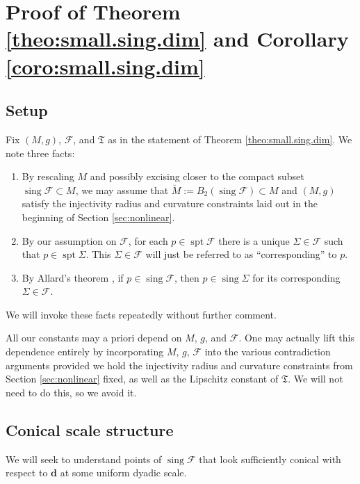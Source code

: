 \documentclass[11pt, letterpaper, reqno]{amsart}
\numberwithin{equation}{section}
\theoremstyle{remark}
\newcommand{\mbfd}{\mathbf{d}}
\newcommand{\frT}{\mathfrak{T}}
\newcommand{\supp}{\operatorname{spt}}
\newcommand{\sing}{\operatorname{sing}}
\begin{document}

\section{Proof of Theorem \ref{theo:small.sing.dim} and Corollary \ref{coro:small.sing.dim}} \label{sec:proof}

\subsection{Setup} \label{sec:proof.setup}

Fix $(M, g)$, $\mathscr{F}$, and $\frT$ as in the statement of Theorem \ref{theo:small.sing.dim}. We note three facts:
\begin{enumerate}
	\item By rescaling $M$ and possibly excising closer to the compact subset $\sing \mathscr{F} \subset M$, we may assume that $\breve M := B_2(\sing \mathscr{F}) \subset M$ and $(M, g)$ satisfy the injectivity radius and curvature constraints laid out in the beginning of Section \ref{sec:nonlinear}.
	\item By our assumption on $\mathscr{F}$, for each $p \in \supp \mathscr{F}$ there is a unique $\Sigma \in \mathscr{F}$ such that $p \in \supp \Sigma$. This $\Sigma \in \mathscr{F}$ will just be referred to as ``corresponding'' to $p$. 
	\item By Allard's theorem \cite{Allard:first-variation}, if $p \in \sing \mathscr{F}$, then $p \in \sing \Sigma$ for its corresponding $\Sigma \in \mathscr{F}$.
\end{enumerate}
We will invoke these facts repeatedly without further comment. 

All our constants may a priori depend on $M$, $g$, and $\mathscr{F}$. One may actually lift this dependence entirely by incorporating $M$, $g$, $\mathscr{F}$ into the various contradiction arguments provided we hold the injectivity radius and curvature constraints 
from Section \ref{sec:nonlinear} fixed, as well as the Lipschitz constant of $\mathfrak{T}$. We will not need to do this, so we avoid it.

\subsection{Conical scale structure}

We will seek to understand points of $\sing \mathscr{F}$ that look sufficiently conical with respect to $\mbfd$ at some uniform dyadic scale. 
\end{document}
